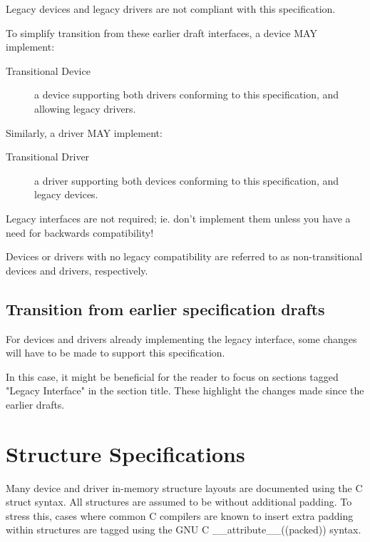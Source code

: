 Legacy devices and legacy drivers are not compliant with this
specification.

To simplify transition from these earlier draft interfaces,
a device MAY implement:

\begin{description}
\item[Transitional Device]
        a device supporting both drivers conforming to this
        specification, and allowing legacy drivers.
\end{description}

Similarly, a driver MAY implement:
\begin{description}
\item[Transitional Driver]
        a driver supporting both devices conforming to this
        specification, and legacy devices.
\end{description}

\begin{note}
  Legacy interfaces are not required; ie. don't implement them unless you
  have a need for backwards compatibility!
\end{note}

Devices or drivers with no legacy compatibility are referred to as
non-transitional devices and drivers, respectively.

\subsection{Transition from earlier specification drafts}\label{sec:Transition from earlier specification drafts}

For devices and drivers already implementing the legacy
interface, some changes will have to be made to support this
specification.

In this case, it might be beneficial for the reader to focus on
sections tagged "Legacy Interface" in the section title.
These highlight the changes made since the earlier drafts.

\section{Structure Specifications}\label{sec:Structure Specifications}

Many device and driver in-memory structure layouts are documented using
the C struct syntax. All structures are assumed to be without additional
padding. To stress this, cases where common C compilers are known to insert
extra padding within structures are tagged using the GNU C
__attribute__((packed))  syntax.

